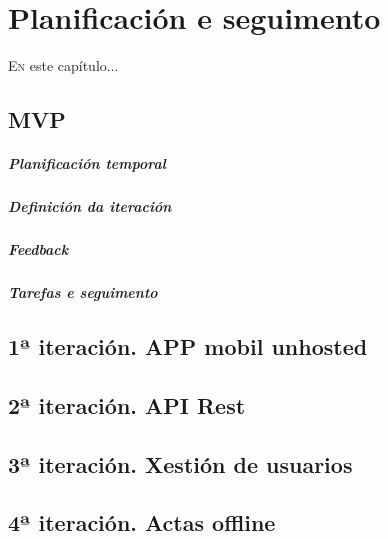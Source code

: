 \chapter{Planificación e seguimento}
\minitoc
\label{chap:Planificacioneseguimento}
\vspace{0.5cm}


  \lettrine{E}{n} este capítulo...

  \section{MVP}
    \paragraph{Planificación temporal}
    \paragraph{Definición da iteración}
    \paragraph{Feedback}
    \paragraph{Tarefas e seguimento}
  \section{1ª iteración. APP mobil unhosted}
  \section{2ª iteración. API Rest}
  \section{3ª iteración. Xestión de usuarios}
  \section{4ª iteración. Actas offline}
